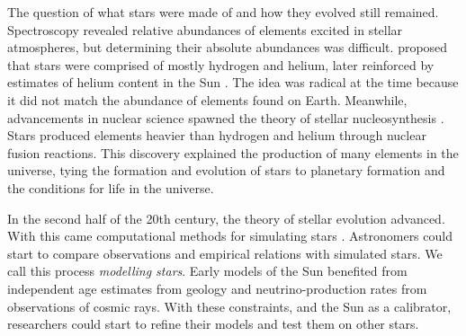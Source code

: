 



The question of what stars were made of and how they evolved still remained. Spectroscopy revealed relative abundances of elements excited in stellar atmospheres, but determining their absolute abundances was difficult. \citet{Payne1925} proposed that stars were comprised of mostly hydrogen and helium, later reinforced by estimates of helium content in the Sun \citep[e.g.][]{Schwarzschild1946}. The idea was radical at the time because it did not match the abundance of elements found on Earth. Meanwhile, advancements in nuclear science spawned the theory of stellar nucleosynthesis \citep{Hoyle1946}. Stars produced elements heavier than hydrogen and helium through nuclear fusion reactions. This discovery explained the production of many elements in the universe, tying the formation and evolution of stars to planetary formation and the conditions for life in the universe.

In the second half of the 20th century, the theory of stellar evolution advanced. With this came computational methods for simulating stars \citep[e.g.][]{Kippenhahn.Weigert.ea1967}. Astronomers could start to compare observations and empirical relations with simulated stars. We call this process \emph{modelling stars}. Early models of the Sun benefited from independent age estimates from geology and neutrino-production rates from observations of cosmic rays. With these constraints, and the Sun as a calibrator, researchers could start to refine their models and test them on other stars. 

